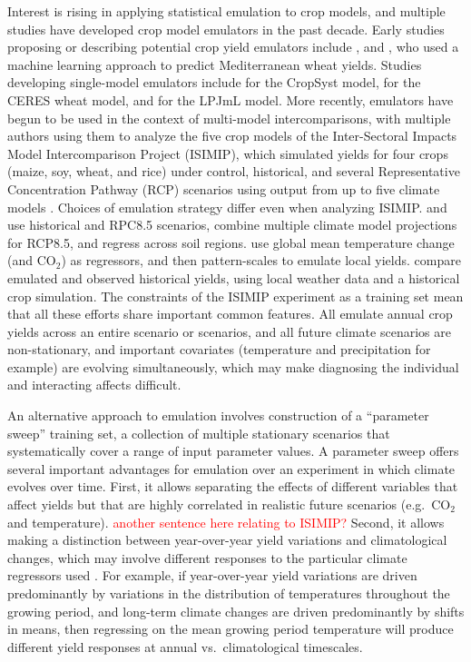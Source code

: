 \documentclass[gmd, manuscript]{copernicus} %
\begin{document}
Interest is rising in applying statistical emulation to crop models, and multiple studies have developed crop model emulators in the past decade.
Early studies proposing or describing potential crop yield emulators include \citet{Howden2005, raisen2006, Lobell2010}, and \citet{Ferrise2011}, who used a machine learning approach to predict Mediterranean wheat yields. 
Studies developing single-model emulators include  \citet{Holzkamper2012} for the CropSyst model, \citet{RUANE2013a} for the CERES wheat model, and \citet{Oyebamiji15} for the LPJmL model. 
More recently, emulators have begun to be used in the context of multi-model intercomparisons, with multiple authors \citep{BLANC2015, BLANC2017, Ostberg2018, Mistry2017}  using them to analyze the five crop models of the Inter-Sectoral Impacts Model Intercomparison Project (ISIMIP), which simulated yields for four crops (maize, soy, wheat, and rice) under control, historical, and several Representative Concentration Pathway (RCP) scenarios using output from up to five climate models \citep{Warszawski3228, Frieler2017}.
Choices of emulation strategy differ even when analyzing ISIMIP. 
\citet{BLANC2015} and \citet{BLANC2017} use historical and RPC8.5 scenarios, combine multiple climate model projections for RCP8.5, and regress across soil regions. 
\citet{Ostberg2018} use global mean temperature change (and CO$_2$) as regressors, and then pattern-scales to emulate local yields. 
\citet{Mistry2017} compare emulated and observed historical yields, using local weather data and a historical crop simulation. 
The constraints of the ISIMIP experiment as a training set mean that all these efforts share important common features. 
All emulate annual crop yields across an entire scenario or scenarios, and all future climate scenarios are non-stationary, and important covariates (temperature and precipitation for example) are evolving simultaneously, which may make diagnosing the individual and interacting affects difficult.  

An alternative approach to emulation involves construction of a ``parameter sweep'' training set, a collection of multiple stationary scenarios that systematically cover a range of input parameter values.
A parameter sweep offers several important advantages for emulation over an experiment in which climate evolves over time. 
First, it allows separating the effects of different variables that affect yields but that are highly correlated in realistic future scenarios (e.g.\ CO$_2$ and temperature). 
\textcolor{red}{another sentence here relating to ISIMIP?}
Second, it allows making a distinction between year-over-year yield variations and climatological changes, which may involve different responses to the particular climate regressors used \citep[e.g.][]{Ruane2016}. 
For example, if year-over-year yield variations are driven predominantly by variations in the distribution of temperatures throughout the growing period, and long-term climate changes are driven predominantly by shifts in means, then regressing on the mean growing period temperature will produce different yield responses at annual vs.\ climatological timescales.  
\end{document}
